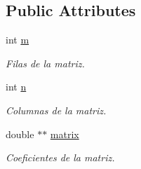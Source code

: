 \subsection*{Public Attributes}
\begin{DoxyCompactItemize}
\item 
int \hyperlink{class_matriz_a7141f8b75ce8aa34bded24988fd30998}{m}
\begin{DoxyCompactList}\small\item\em Filas de la matriz. \end{DoxyCompactList}\item 
int \hyperlink{class_matriz_a3b5041f8eaee4aa3ef646378f0dd2d6d}{n}
\begin{DoxyCompactList}\small\item\em Columnas de la matriz. \end{DoxyCompactList}\item 
double $\ast$$\ast$ \hyperlink{class_matriz_a9a061f4b43d8ba4be7377311590450c1}{matrix}
\begin{DoxyCompactList}\small\item\em Coeficientes de la matriz. \end{DoxyCompactList}\end{DoxyCompactItemize}


